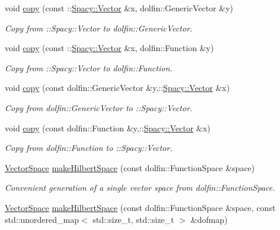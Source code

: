 \begin{DoxyCompactItemize}
void \hyperlink{group__FenicsGroup_ga7f43f0c660d0646adb031b453c536bb0}{copy} (const \+::\hyperlink{classSpacy_1_1Vector}{Spacy\+::\+Vector} \&x, dolfin\+::\+Generic\+Vector \&y)
\begin{DoxyCompactList}\small\item\em Copy from \+:\+:Spacy\+:\+:Vector to dolfin\+::\+Generic\+Vector. \end{DoxyCompactList}\item 
void \hyperlink{group__FenicsGroup_ga28fb1ebae29e07ec0256bb2331599aa7}{copy} (const \+::\hyperlink{classSpacy_1_1Vector}{Spacy\+::\+Vector} \&x, dolfin\+::\+Function \&y)
\begin{DoxyCompactList}\small\item\em Copy from \+:\+:Spacy\+:\+:Vector to dolfin\+::\+Function. \end{DoxyCompactList}\item 
void \hyperlink{group__FenicsGroup_ga61c5e45dbb789c155fbf86f8ec288f17}{copy} (const dolfin\+::\+Generic\+Vector \&y,\+::\hyperlink{classSpacy_1_1Vector}{Spacy\+::\+Vector} \&x)
\begin{DoxyCompactList}\small\item\em Copy from dolfin\+::\+Generic\+Vector to \+:\+:Spacy\+:\+:Vector. \end{DoxyCompactList}\item 
void \hyperlink{namespaceSpacy_1_1FEniCS_a7c4519bd0cbdc4e72b71f273bade591e}{copy} (const dolfin\+::\+Function \&y,\+::\hyperlink{classSpacy_1_1Vector}{Spacy\+::\+Vector} \&x)
\begin{DoxyCompactList}\small\item\em Copy from dolfin\+::\+Function to \+:\+:Spacy\+:\+:Vector. \end{DoxyCompactList}\item 
\hyperlink{classSpacy_1_1VectorSpace}{Vector\+Space} \hyperlink{group__FenicsGroup_ga89defe8c7e08ab224af2a3cd0445e254}{make\+Hilbert\+Space} (const dolfin\+::\+Function\+Space \&space)
\begin{DoxyCompactList}\small\item\em Convenient generation of a single vector space from dolfin\+::\+Function\+Space. \end{DoxyCompactList}\item 
\hyperlink{classSpacy_1_1VectorSpace}{Vector\+Space} \hyperlink{group__FenicsGroup_ga1aaf48bfbd005bee810090a01404ab4a}{make\+Hilbert\+Space} (const dolfin\+::\+Function\+Space \&space, const std\+::unordered\+\_\+map$<$ std\+::size\+\_\+t, std\+::size\+\_\+t $>$ \&dofmap)

\end{DoxyCompactItemize}
